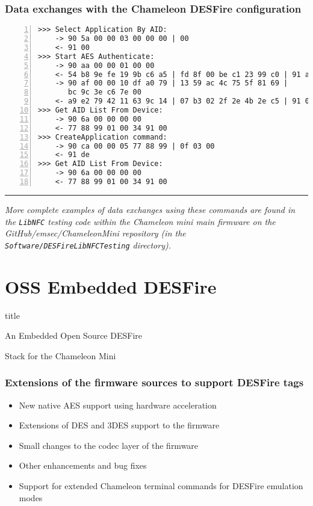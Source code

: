 \documentclass[usenames,svgnames,dvipsnames,11pt]{beamer}
\newcommand{\TitleBoxed}[1]{
     \begin{beamercolorbox}[sep=8pt,center,shadow=true,rounded=true]{title}
          \usebeamerfont{title}#1\par%
     \end{beamercolorbox}
}
\begin{document}
\begin{frame}[fragile]
\frametitle{Data exchanges with the Chameleon DESFire configuration}

\begin{Verbatim}[numbers=left,fontsize=\scriptsize,frame=single]
>>> Select Application By AID:
    -> 90 5a 00 00 03 00 00 00 | 00 
    <- 91 00 
>>> Start AES Authenticate:
    -> 90 aa 00 00 01 00 00 
    <- 54 b8 9e fe 19 9b c6 a5 | fd 8f 00 be c1 23 99 c0 | 91 af 
    -> 90 af 00 00 10 df a0 79 | 13 59 ac 4c 75 5f 81 69 | 
       bc 9c 3e c6 7e 00 
    <- a9 e2 79 42 11 63 9c 14 | 07 b3 02 2f 2e 4b 2e c5 | 91 00 
>>> Get AID List From Device:
    -> 90 6a 00 00 00 00 
    <- 77 88 99 01 00 34 91 00 
>>> CreateApplication command:
    -> 90 ca 00 00 05 77 88 99 | 0f 03 00 
    <- 91 de 
>>> Get AID List From Device:
    -> 90 6a 00 00 00 00 
    <- 77 88 99 01 00 34 91 00 
\end{Verbatim}

\medskip\hrule\medskip
\noindent\it\scriptsize 
More complete examples of data exchanges using these commands are found in the 
\texttt{LibNFC} testing code within the 
Chameleon mini main firmware on the \textit{GitHub/emsec/ChameleonMini} repository 
(in the \texttt{Software/DESFireLibNFCTesting} directory). 

\end{frame}

\section{OSS Embedded DESFire}

\begin{frame}
\TitleBoxed{
     \huge{\centerline{An Embedded Open Source DESFire}}
     \huge{\centerline{Stack for the Chameleon Mini}}
}
\end{frame}

\begin{frame}
\frametitle{Extensions of the firmware sources to support DESFire tags}

\begin{itemize}
\item New native AES support using hardware acceleration
\item Extensions of DES and 3DES support to the firmware 
\item Small changes to the codec layer of the firmware
\item Other enhancements and bug fixes
\item Support for extended Chameleon terminal commands for DESFire emulation modes 
\end{itemize}

\end{frame}
\end{document}
